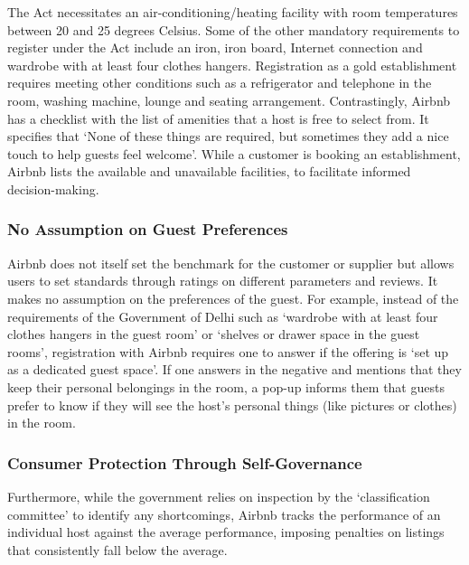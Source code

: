 \documentclass[a4paper, 12pt]{article}
\begin{document}
The Act necessitates an air-conditioning/heating facility with room temperatures between 20 and 25 degrees Celsius. Some of the other mandatory requirements to register under the Act include an iron, iron board, Internet connection and wardrobe with at least four clothes hangers. Registration as a gold establishment requires meeting other conditions such as a refrigerator and telephone in the room, washing machine, lounge and seating arrangement. Contrastingly, Airbnb has a checklist with the list of amenities that a host is free to select from. It specifies that ‘None of these things are required, but sometimes they add a nice touch to help guests feel welcome’. While a customer is booking an establishment, Airbnb lists the available and unavailable facilities, to facilitate informed decision-making.


                    \subsubsection{No Assumption on Guest Preferences}
                    Airbnb does not itself set the benchmark for the customer or supplier but allows users to set standards through ratings on different parameters and reviews. It makes no assumption on the preferences of the guest. For example, instead of the requirements of the Government of Delhi such as ‘wardrobe with at least four clothes hangers in the guest room’ or ‘shelves or drawer space in the guest rooms’, registration with Airbnb requires one to answer if the offering is ‘set up as a dedicated guest space’. If one answers in the negative and mentions that they keep their personal belongings in the room, a pop-up informs them that guests prefer to know if they will see the host’s personal things (like pictures or clothes) in the room.

               \subsubsection{Consumer Protection Through Self-Governance}
                   Furthermore, while the government relies on inspection by the ‘classification committee’ to identify any shortcomings, Airbnb tracks the performance of an individual host against the average performance, imposing penalties on listings that consistently fall below the average.\\
\end{document}
